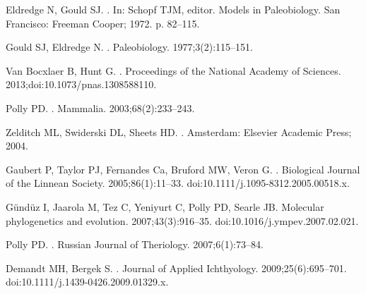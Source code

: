 \documentclass[10pt,letterpaper]{article}
\begin{document}
\begin{thebibliography}{10}
  Eldredge N, Gould SJ.
.
\newblock In: Schopf TJM, editor. Models in Paleobiology. San Francisco:
  Freeman Cooper; 1972. p. 82--115.

  Gould SJ, Eldredge N.
.
\newblock Paleobiology. 1977;3(2):115--151.

  {Van Bocxlaer} B, Hunt G.
.
\newblock Proceedings of the National Academy of Sciences.
  2013;doi:{10.1073/pnas.1308588110}.

  Polly PD.
.
\newblock Mammalia. 2003;68(2):233--243.

  Zelditch ML, Swiderski DL, Sheets HD.
.
\newblock Amsterdam: Elsevier Academic Press; 2004.

  Gaubert P, Taylor PJ, Fernandes Ca, Bruford MW, Veron G.
.
\newblock Biological Journal of the Linnean Society. 2005;86(1):11--33.
\newblock doi:{10.1111/j.1095-8312.2005.00518.x}.

  G{\"{u}}nd{\"{u}}z I, Jaarola M, Tez C, Yeniyurt C, Polly PD, Searle JB.
\newblock Molecular phylogenetics and evolution. 2007;43(3):916--35.
\newblock doi:{10.1016/j.ympev.2007.02.021}.

  Polly PD.
.
\newblock Russian Journal of Theriology. 2007;6(1):73--84.

  Demandt MH, Bergek S.
.
\newblock Journal of Applied Ichthyology. 2009;25(6):695--701.
\newblock doi:{10.1111/j.1439-0426.2009.01329.x}.


\end{thebibliography}
\end{document}
